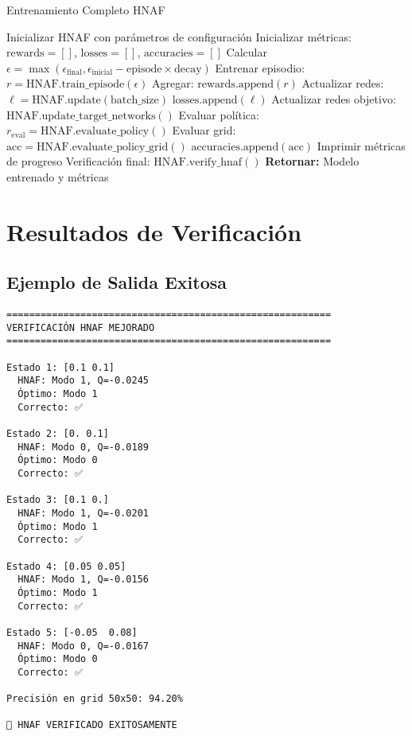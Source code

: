 \documentclass[12pt,a4paper]{article}
\begin{document}
\begin{algorithm}
\caption{Entrenamiento Completo HNAF}
\begin{algorithmic}[1]
\STATE Inicializar HNAF con parámetros de configuración
\STATE Inicializar métricas: $\text{rewards} = []$, $\text{losses} = []$, $\text{accuracies} = []$
    \STATE Calcular $\epsilon = \max(\epsilon_{\text{final}}, \epsilon_{\text{inicial}} - \text{episode} \times \text{decay})$
    \STATE Entrenar episodio: $r = \text{HNAF.train\_episode}(\epsilon)$
    \STATE Agregar: $\text{rewards.append}(r)$
    \STATE Actualizar redes: $\ell = \text{HNAF.update}(\text{batch\_size})$
        \STATE $\text{losses.append}(\ell)$
    \ENDIF
    \STATE Actualizar redes objetivo: $\text{HNAF.update\_target\_networks}()$
        \STATE Evaluar política: $r_{\text{eval}} = \text{HNAF.evaluate\_policy}()$
        \STATE Evaluar grid: $\text{acc} = \text{HNAF.evaluate\_policy\_grid}()$
        \STATE $\text{accuracies.append}(\text{acc})$
        \STATE Imprimir métricas de progreso
    \ENDIF
\ENDFOR
\STATE Verificación final: $\text{HNAF.verify\_hnaf}()$
\STATE \textbf{Retornar:} Modelo entrenado y métricas
\end{algorithmic}
\end{algorithm}

\section{Resultados de Verificación}

\subsection{Ejemplo de Salida Exitosa}

\begin{lstlisting}[frame=single, caption=Verificación Exitosa]
=========================================================
VERIFICACIÓN HNAF MEJORADO
=========================================================

Estado 1: [0.1 0.1]
  HNAF: Modo 1, Q=-0.0245
  Óptimo: Modo 1
  Correcto: ✅

Estado 2: [0. 0.1]
  HNAF: Modo 0, Q=-0.0189
  Óptimo: Modo 0
  Correcto: ✅

Estado 3: [0.1 0.]
  HNAF: Modo 1, Q=-0.0201
  Óptimo: Modo 1
  Correcto: ✅

Estado 4: [0.05 0.05]
  HNAF: Modo 1, Q=-0.0156
  Óptimo: Modo 1
  Correcto: ✅

Estado 5: [-0.05  0.08]
  HNAF: Modo 0, Q=-0.0167
  Óptimo: Modo 0
  Correcto: ✅

Precisión en grid 50x50: 94.20%

🎉 HNAF VERIFICADO EXITOSAMENTE
\end{lstlisting}
\end{document}
